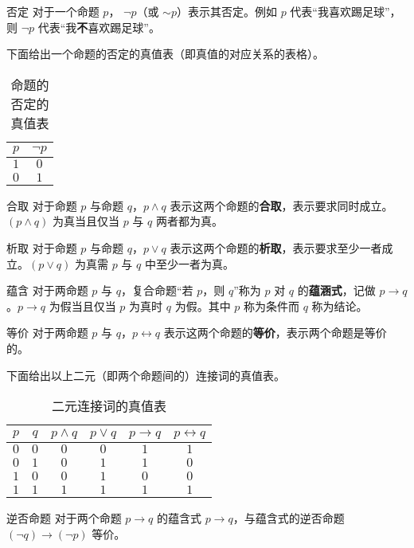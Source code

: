 
\begin{definition}{否定}
对于一个命题 $p$， $\neg p$（或 $\sim p$）表示其否定。例如 $p$ 代表“我喜欢踢足球”，则 $\neg p$ 代表“我\textbf{不}喜欢踢足球”。
\end{definition}

下面给出一个命题的否定的真值表（即真值的对应关系的表格）。
\begin{table}[ht]
\centering
\caption{命题的否定的真值表}\label{tab_propco1}
\begin{tabular}{|c|c|}
\hline
$p$ & $\neg p$ \\
\hline
$1$ & $0$ \\
\hline
$0$ & $1$ \\
\hline
\end{tabular}
\end{table}


\begin{definition}{合取}
对于命题 $p$ 与命题 $q$，$p \land q$ 表示这两个命题的\textbf{合取}，表示要求同时成立。$(p \land q)$ 为真当且仅当 $p$ 与 $q$ 两者都为真。
\end{definition}

\begin{definition}{析取}
对于命题 $p$ 与命题 $q$，$p \lor q$ 表示这两个命题的\textbf{析取}，表示要求至少一者成立。$(p \lor q)$ 为真需 $p$ 与 $q$ 中至少一者为真。
\end{definition}

\begin{definition}{蕴含}
对于两命题 $p$ 与 $q$，复合命题“若 $p$，则 $q$”称为 $p$ 对 $q$ 的\textbf{蕴涵式}，记做 $p \to q$。$p \to q$ 为假当且仅当 $p$ 为真时 $q$ 为假。其中 $p$ 称为条件而 $q$ 称为结论。
\end{definition}

\begin{definition}{等价}
对于两命题 $p$ 与 $q$，$p \leftrightarrow q$ 表示这两个命题的\textbf{等价}，表示两个命题是等价的。
\end{definition}

下面给出以上二元（即两个命题间的）连接词的真值表。
\begin{table}[ht]
\centering
\caption{二元连接词的真值表}\label{tab_propco2}
\begin{tabular}{|c|c|c|c|c|c|}
\hline
$p$ & $q$ & $p \land q$ & $p \lor q$ & $p \to q$ & $p \leftrightarrow q$ \\
\hline
$0$ & $0$ & $0$ & $0$ & $1$ & $1$ \\
\hline
$0$ & $1$ & $0$ & $1$ & $1$ & $0$ \\
\hline
$1$ & $0$ & $0$ & $1$ & $0$ & $0$ \\
\hline
$1$ & $1$ & $1$ & $1$ & $1$ & $1$ \\
\hline
\end{tabular}
\end{table}

\begin{theorem}{逆否命题}
对于两个命题 $p \rightarrow q$ 的蕴含式 $p \rightarrow q$，与蕴含式的逆否命题 $(\neg q) \rightarrow (\neg p)$ 等价。
\end{theorem}